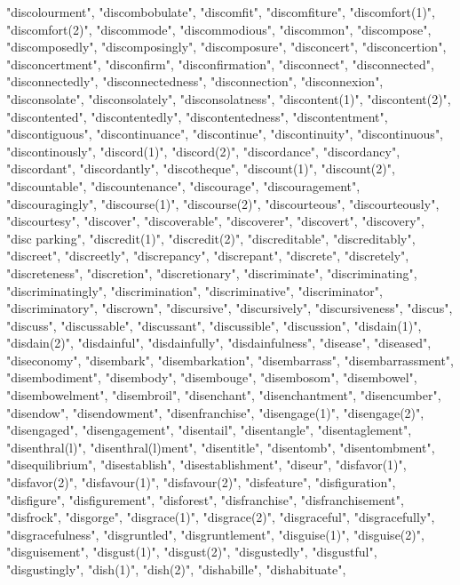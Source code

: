 "discolourment",
"discombobulate",
"discomfit",
"discomfiture",
"discomfort(1)",
"discomfort(2)",
"discommode",
"discommodious",
"discommon",
"discompose",
"discomposedly",
"discomposingly",
"discomposure",
"disconcert",
"disconcertion",
"disconcertment",
"disconfirm",
"disconfirmation",
"disconnect",
"disconnected",
"disconnectedly",
"disconnectedness",
"disconnection",
"disconnexion",
"disconsolate",
"disconsolately",
"disconsolatness",
"discontent(1)",
"discontent(2)",
"discontented",
"discontentedly",
"discontentedness",
"discontentment",
"discontiguous",
"discontinuance",
"discontinue",
"discontinuity",
"discontinuous",
"discontinously",
"discord(1)",
"discord(2)",
"discordance",
"discordancy",
"discordant",
"discordantly",
"discotheque",
"discount(1)",
"discount(2)",
"discountable",
"discountenance",
"discourage",
"discouragement",
"discouragingly",
"discourse(1)",
"discourse(2)",
"discourteous",
"discourteously",
"discourtesy",
"discover",
"discoverable",
"discoverer",
"discovert",
"discovery",
"disc parking",
"discredit(1)",
"discredit(2)",
"discreditable",
"discreditably",
"discreet",
"discreetly",
"discrepancy",
"discrepant",
"discrete",
"discretely",
"discreteness",
"discretion",
"discretionary",
"discriminate",
"discriminating",
"discriminatingly",
"discrimination",
"discriminative",
"discriminator",
"discriminatory",
"discrown",
"discursive",
"discursively",
"discursiveness",
"discus",
"discuss",
"discussable",
"discussant",
"discussible",
"discussion",
"disdain(1)",
"disdain(2)",
"disdainful",
"disdainfully",
"disdainfulness",
"disease",
"diseased",
"diseconomy",
"disembark",
"disembarkation",
"disembarrass",
"disembarrassment",
"disembodiment",
"disembody",
"disembouge",
"disembosom",
"disembowel",
"disembowelment",
"disembroil",
"disenchant",
"disenchantment",
"disencumber",
"disendow",
"disendowment",
"disenfranchise",
"disengage(1)",
"disengage(2)",
"disengaged",
"disengagement",
"disentail",
"disentangle",
"disentaglement",
"disenthral(l)",
"disenthral(l)ment",
"disentitle",
"disentomb",
"disentombment",
"disequilibrium",
"disestablish",
"disestablishment",
"diseur",
"disfavor(1)",
"disfavor(2)",
"disfavour(1)",
"disfavour(2)",
"disfeature",
"disfiguration",
"disfigure",
"disfigurement",
"disforest",
"disfranchise",
"disfranchisement",
"disfrock",
"disgorge",
"disgrace(1)",
"disgrace(2)",
"disgraceful",
"disgracefully",
"disgracefulness",
"disgruntled",
"disgruntlement",
"disguise(1)",
"disguise(2)",
"disguisement",
"disgust(1)",
"disgust(2)",
"disgustedly",
"disgustful",
"disgustingly",
"dish(1)",
"dish(2)",
"dishabille",
"dishabituate",
